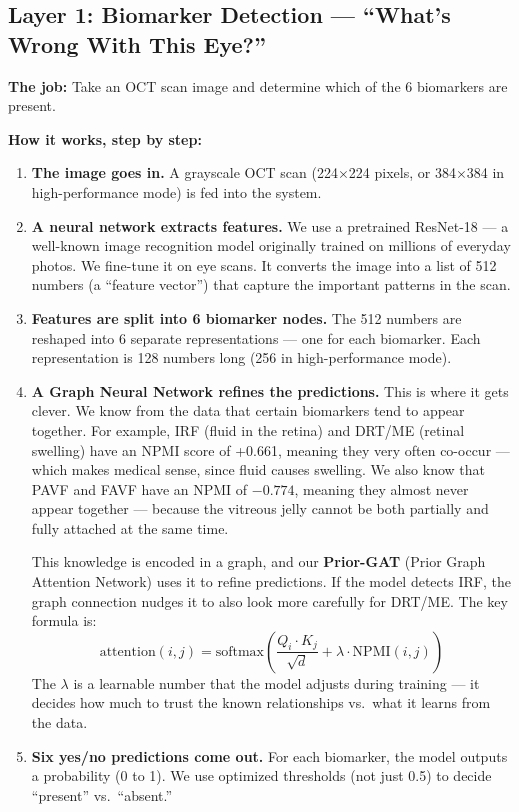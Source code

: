 \documentclass[12pt,a4paper]{article}
\begin{document}
\subsection{Layer 1: Biomarker Detection --- ``What's Wrong With This Eye?''}

\textbf{The job:} Take an OCT scan image and determine which of the 6 biomarkers are present.

\textbf{How it works, step by step:}

\begin{enumerate}
  \item \textbf{The image goes in.} A grayscale OCT scan (224$\times$224 pixels, or 384$\times$384 in high-performance mode) is fed into the system.

  \item \textbf{A neural network extracts features.} We use a pretrained ResNet-18 --- a well-known image recognition model originally trained on millions of everyday photos. We fine-tune it on eye scans. It converts the image into a list of 512 numbers (a ``feature vector'') that capture the important patterns in the scan.

  \item \textbf{Features are split into 6 biomarker nodes.} The 512 numbers are reshaped into 6 separate representations --- one for each biomarker. Each representation is 128 numbers long (256 in high-performance mode).

  \item \textbf{A Graph Neural Network refines the predictions.} This is where it gets clever. We know from the data that certain biomarkers tend to appear together. For example, IRF (fluid in the retina) and DRT/ME (retinal swelling) have an NPMI score of +0.661, meaning they very often co-occur --- which makes medical sense, since fluid causes swelling. We also know that PAVF and FAVF have an NPMI of $-0.774$, meaning they almost never appear together --- because the vitreous jelly cannot be both partially and fully attached at the same time.

  This knowledge is encoded in a graph, and our \textbf{Prior-GAT} (Prior Graph Attention Network) uses it to refine predictions. If the model detects IRF, the graph connection nudges it to also look more carefully for DRT/ME. The key formula is:
  \[
  \text{attention}(i, j) = \text{softmax}\!\left(\frac{Q_i \cdot K_j}{\sqrt{d}} + \lambda \cdot \text{NPMI}(i,j)\right)
  \]
  The $\lambda$ is a learnable number that the model adjusts during training --- it decides how much to trust the known relationships vs.\ what it learns from the data.

  \item \textbf{Six yes/no predictions come out.} For each biomarker, the model outputs a probability (0 to 1). We use optimized thresholds (not just 0.5) to decide ``present'' vs.\ ``absent.''
\end{enumerate}
\end{document}
